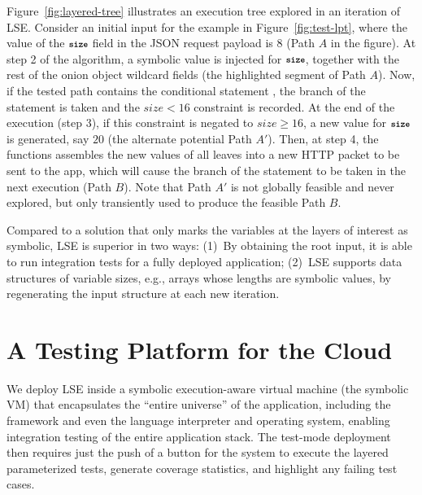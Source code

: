 Figure~\ref{fig:layered-tree} illustrates an execution tree explored in an iteration of LSE. Consider an initial input for the example in Figure~\ref{fig:test-lpt}, where the value of the $\texttt{\footnotesize \bfseries size}$ field in the JSON request payload is $8$ (Path $A$ in the figure).
%
At step 2 of the algorithm, a symbolic value is injected for $\texttt{\footnotesize \bfseries size}$, together with the rest of the onion object wildcard fields (the highlighted segment of Path $A$).  Now, if the tested path contains the conditional statement , the  branch of the statement is taken and the $\mathit{size} < 16$ constraint is recorded.  At the end of the execution (step 3), if this constraint is negated to $\mathit{size} \geq 16$, a new value for $\texttt{\footnotesize \bfseries size}$ is generated, say $20$ (the alternate potential Path $A'$).  Then, at step 4, the  functions assembles the new values of all leaves into a new HTTP packet to be sent to the app, which will cause the  branch of the  statement to be taken in the next execution (Path $B$).  Note that Path $A'$ is not globally feasible and never explored, but only transiently used to produce the feasible Path $B$.

Compared to a solution that only marks the variables at the layers of interest as symbolic, LSE is superior in two ways: (1)~By obtaining the root input, it is able to run integration tests for a fully deployed application; (2)~LSE supports data structures of variable sizes, e.g., arrays whose lengths are symbolic values, by regenerating the input structure at each new iteration.


\section{A Testing Platform for the Cloud}
\label{sec:paas:fedsymbex}

We deploy LSE inside a symbolic execution-aware virtual machine (the symbolic VM) that encapsulates the ``entire universe'' of the application, including the framework and even the language interpreter and operating system, enabling integration testing of the entire application stack.
%
The test-mode deployment then requires just the push of a button for the system to execute the layered parameterized tests, generate coverage statistics, and highlight any failing test cases.

